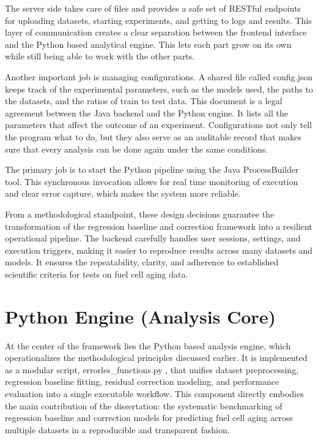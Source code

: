 The server side takes care of files and provides a safe set of RESTful endpoints for uploading datasets, starting experiments, and getting to logs and results. This layer of communication creates a clear separation between the frontend interface and the Python based analytical engine. This lets each part grow on its own while still being able to work with the other parts. 

Another important job is managing configurations. A shared file called config.json keeps track of the experimental parameters, such as the models used, the paths to the datasets, and the ratios of train to test data. This document is a legal agreement between the Java backend and the Python engine. It lists all the parameters that affect the outcome of an experiment. Configurations not only tell the program what to do, but they also serve as an auditable record that makes sure that every analysis can be done again under the same conditions. 

The primary job is to start the Python pipeline using the Java ProcessBuilder tool. This synchronous invocation allows for real time monitoring of execution and clear error capture, which makes the system more reliable. 

From a methodological standpoint, these design decisions guarantee the transformation of the regression baseline and correction framework into a resilient operational pipeline. The backend carefully handles user sessions, settings, and execution triggers, making it easier to reproduce results across many datasets and models. It ensures the repeatability, clarity, and adherence to established scientific criteria for tests on fuel cell aging data.
\section{Python Engine (Analysis Core)}

At the center of the framework lies the Python based analysis engine, which operationalizes the methodological principles discussed earlier. It is implemented as a modular script, errorles\_functions.py , that unifies dataset preprocessing, regression baseline fitting, residual correction modeling, and performance evaluation into a single executable workflow. This component directly embodies the main contribution of the dissertation: the systematic benchmarking of regression baseline and correction models for predicting fuel cell aging across multiple datasets in a reproducible and transparent fashion.

